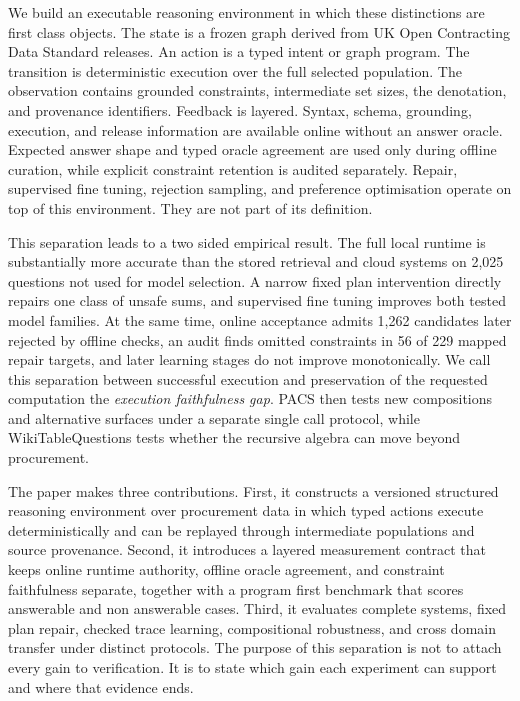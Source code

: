 \documentclass{article}
\begin{document}
We build an executable reasoning environment in which these distinctions are first class objects.
The state is a frozen graph derived from UK Open Contracting Data Standard releases.  An action is a
typed intent or graph program.  The transition is deterministic execution over the full selected
population.  The observation contains grounded constraints, intermediate set sizes, the denotation,
and provenance identifiers.  Feedback is layered.  Syntax, schema, grounding, execution, and
release information are available online without an answer oracle.  Expected answer shape and
typed oracle agreement are used only during offline curation, while explicit constraint retention
is audited separately.  Repair, supervised fine tuning, rejection sampling, and preference
optimisation operate on top of this environment.  They are not part of its definition.

This separation leads to a two sided empirical result.  The full local runtime is substantially
more accurate than the stored retrieval and cloud systems on 2,025 questions not used for model
selection.  A narrow fixed plan intervention directly repairs one class of unsafe sums, and
supervised fine tuning improves both tested model families.  At the same time, online acceptance
admits 1,262 candidates later rejected by offline checks, an audit finds omitted constraints in 56
of 229 mapped repair targets, and later learning stages do not improve monotonically.  We call this
separation between successful execution and preservation of the requested computation the
\emph{execution faithfulness gap}.  PACS then tests new compositions and alternative surfaces under
a separate single call protocol, while WikiTableQuestions tests whether the recursive algebra can
move beyond procurement.

The paper makes three contributions.  First, it constructs a versioned structured reasoning
environment over procurement data in which typed actions execute deterministically and can be
replayed through intermediate populations and source provenance.  Second, it introduces a layered
measurement contract that keeps online runtime authority, offline oracle agreement, and constraint
faithfulness separate, together with a program first benchmark that scores answerable and non
answerable cases.  Third, it evaluates complete systems, fixed plan repair, checked trace learning,
compositional robustness, and cross domain transfer under distinct protocols.  The purpose of this
separation is not to attach every gain to verification.  It is to state which gain each experiment
can support and where that evidence ends.
\end{document}

